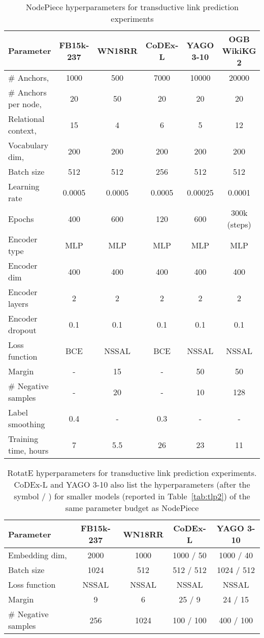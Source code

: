 \documentclass{article} \usepackage{iclr2022_conference,times}
\begin{document}
\begin{table}[!h]
\centering
\caption{NodePiece hyperparameters for transductive link prediction experiments}
\label{tab:hyperparams_np}
\begin{tabular}{@{}lccccc@{}}
\toprule
Parameter & FB15k-237 & WN18RR & CoDEx-L & YAGO 3-10 & OGB WikiKG 2 \\ \midrule
\# Anchors,  & 1000 & 500 & 7000 & 10000 & 20000 \\
\# Anchors per node,  & 20 & 50 & 20 & 20 & 20 \\
Relational context,  & 15 & 4 & 6 & 5 & 12 \\
Vocabulary dim,  & 200 & 200 & 200 & 200 & 200 \\
Batch size & 512 & 512 & 256 & 512 & 512  \\
Learning rate & 0.0005 & 0.0005 & 0.0005 & 0.00025 & 0.0001 \\
Epochs & 400 & 600 & 120 & 600 & 300k (steps) \\
Encoder type & MLP & MLP & MLP & MLP & MLP \\
Encoder dim & 400 & 400 & 400  & 400 & 400 \\
Encoder layers & 2 & 2 & 2 & 2 & 2 \\
Encoder dropout & 0.1 & 0.1 & 0.1 & 0.1 & 0.1 \\
Loss function & BCE & NSSAL & BCE & NSSAL & NSSAL \\
Margin & - & 15 & - & 50 & 50 \\
\# Negative samples & - & 20 & - & 10 & 128 \\
Label smoothing & 0.4 & - & 0.3 & - & - \\ \midrule
Training time, hours & 7 & 5.5 & 26 & 23 & 11 \\
\bottomrule
\end{tabular}
\end{table}

\begin{table}[!h]
\centering
\caption{RotatE hyperparameters for transductive link prediction experiments. CoDEx-L and YAGO 3-10 also list the hyperparameters (after the symbol / ) for smaller models (reported in Table~\ref{tab:tlp2}) of the same parameter budget as NodePiece }
\label{tab:hyperparams_baseline}
\begin{tabular}{@{}lcccc@{}}
\toprule
Parameter & FB15k-237 & WN18RR & CoDEx-L & YAGO 3-10 \\ \midrule
Embedding dim,  & 2000 & 1000 & 1000 / 50 & 1000 / 40 \\
Batch size & 1024 & 512 & 512 / 512 & 1024 / 512 \\
Loss function & NSSAL & NSSAL & NSSAL & NSSAL \\
Margin & 9 & 6 & 25 / 9 & 24 / 15 \\
\# Negative samples & 256 & 1024 & 100 / 100  & 400 / 100 \\
\bottomrule
\end{tabular}
\end{table}
\end{document}
